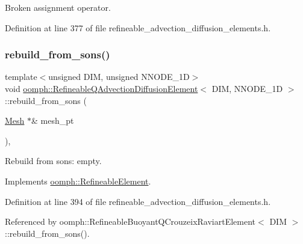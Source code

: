 Broken assignment operator. 



Definition at line 377 of file refineable\+\_\+advection\+\_\+diffusion\+\_\+elements.\+h.

\mbox{\label{classoomph_1_1RefineableQAdvectionDiffusionElement_ad2a59ed27f0ef1509a797a4ad97121c9}} 
\subsubsection{\texorpdfstring{rebuild\+\_\+from\+\_\+sons()}{rebuild\_from\_sons()}}
{\footnotesize\ttfamily template$<$unsigned D\+IM, unsigned N\+N\+O\+D\+E\+\_\+1D$>$ \\
void \hyperlink{classoomph_1_1RefineableQAdvectionDiffusionElement}{oomph\+::\+Refineable\+Q\+Advection\+Diffusion\+Element}$<$ D\+IM, N\+N\+O\+D\+E\+\_\+1D $>$\+::rebuild\+\_\+from\+\_\+sons (\begin{DoxyParamCaption}\item[{\hyperlink{classoomph_1_1Mesh}{Mesh} $\ast$\&}]{mesh\+\_\+pt }\end{DoxyParamCaption})\hspace{0.3cm}{\ttfamily [inline]}, {\ttfamily [virtual]}}



Rebuild from sons\+: empty. 



Implements \hyperlink{classoomph_1_1RefineableElement_a33324be27833fa4b78279d17158215fa}{oomph\+::\+Refineable\+Element}.



Definition at line 394 of file refineable\+\_\+advection\+\_\+diffusion\+\_\+elements.\+h.



Referenced by oomph\+::\+Refineable\+Buoyant\+Q\+Crouzeix\+Raviart\+Element$<$ D\+I\+M $>$\+::rebuild\+\_\+from\+\_\+sons().

\mbox{\label{classoomph_1_1RefineableQAdvectionDiffusionElement_aa685343ba8291d44838c3791c846e27a}} 
